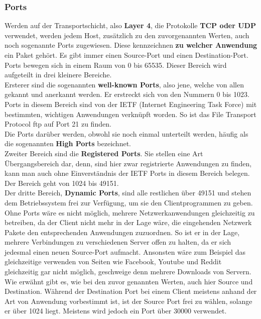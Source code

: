\documentclass[12pt,a4paper]{report}
\begin{document}
\subsubsection{Ports}
Werden auf der Transportschicht, also \textbf{Layer 4}, die Protokolle \textbf{TCP oder UDP} verwendet, werden jedem Host, zusätzlich zu den zuvorgenannten Werten, auch noch sogenannte Ports zugewiesen. Diese kennzeichnen \textbf{zu welcher Anwendung} ein Paket gehört. Es gibt immer einen Source-Port und einen Destination-Port.\\
Ports bewegen sich in einem Raum von 0 bis 65535. Dieser Bereich wird aufgeteilt in drei kleinere Bereiche.\\
Ersterer sind die sogenannten \textbf{well-known Ports}, also jene, welche von allen gekannt und anerkannt werden. Er erstreckt sich von den Nummern 0 bis 1023. Ports in diesem Bereich sind von der IETF (Internet Engineering Task Force) mit bestimmten, wichtigen Anwendungen verknüpft worden. So ist das File Transport Protocol ftp auf Port 21 zu finden.\\
Die Ports darüber werden, obwohl sie noch einmal unterteilt werden, häufig als die sogenannten \textbf{High Ports} bezeichnet.\\
Zweiter Bereich sind die \textbf{Registered Ports}. Sie stellen eine Art Übergangsbereich dar, denn, sind hier zwar registrierte Anwendungen zu finden, kann man auch ohne Einverständnis der IETF Ports in diesem Bereich belegen. Der Bereich geht von 1024 bis 49151.\\
Der dritte Bereich, \textbf{Dynamic Ports}, sind alle restlichen über 49151 und stehen dem Betriebssystem frei zur Verfügung, um sie den Clientprogrammen zu geben.\\

Ohne Ports wäre es nicht möglich, mehrere Netzwerkanwendungen gleichzeitig zu betreiben, da der Client nicht mehr in der Lage wäre, die eingehenden Netzwerk Pakete den entsprechenden Anwendungen zuzuordnen. So ist er in der Lage, mehrere Verbindungen zu verschiedenen Server offen zu halten, da er sich jedesmal einen neuen Source-Port aufmacht. Ansonsten wäre zum Beispiel das gleichzeitige verwenden von Seiten wie Facebook, Youtube und Reddit gleichzeitig gar nicht möglich, geschweige denn mehrere Downloads von Servern.\\

Wie erwähnt gibt es, wie bei den zuvor genannten Werten, auch hier Source und Destination. Während der Destination Port bei einem Client meistens anhand der Art von Anwendung vorbestimmt ist, ist der Source Port frei zu wählen, solange er über 1024 liegt. Meistens wird jedoch ein Port über 30000 verwendet. 
\end{document}
